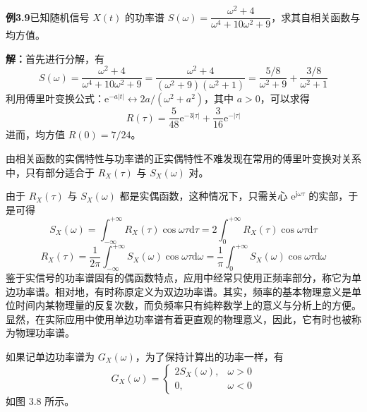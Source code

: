 \documentclass[11pt,openany,UTF8]{ctexbook}
\newcommand{\dif}{\mathrm{d}}                      %
\newcommand{\eu}{\mathrm{e}}                       %
\newcommand{\ju}{\mathrm{j}}                       %
\begin{document}
\begin{examplebox}
\textbf{例3.9}\quad 已知随机信号 $X(t)$ 的功率谱 $S(\omega)=\dfrac{\omega^2+4}{\omega^4+10\omega^2+9}$\nobreak，求其自相关函数与均方值\nobreak。

\textbf{解\nobreak：}\quad 首先进行分解\nobreak，有
\[
S(\omega)=\frac{\omega^2+4}{\omega^4+10\omega^2+9}=\frac{\omega^2+4}{(\omega^2+9)(\omega^2+1)}=\frac{5/8}{\omega^2+9}+\frac{3/8}{\omega^2+1}
\]
利用傅里叶变换公式\nobreak：$\eu^{-a\lvert t\rvert}\longleftrightarrow 2a/(\omega^2+a^2)$\nobreak，其中 $a>0$\nobreak，可以求得
\[
R(\tau)=\frac{5}{48}\eu^{-3\lvert\tau\rvert}+\frac{3}{16}\eu^{-\lvert\tau\rvert}
\]
进而\nobreak，均方值 $R(0)=7/24$\nobreak。
\end{examplebox}

由相关函数的实偶特性与功率谱的正实偶特性不难发现在常用的傅里叶变换对关系中\nobreak，只有部分适合于 $R_X(\tau)$ 与 $S_X(\omega)$ 对\nobreak。

由于 $R_X(\tau)$ 与 $S_X(\omega)$ 都是实偶函数\nobreak，这种情况下\nobreak，只需关心 $\eu^{\ju\omega\tau}$ 的实部\nobreak，于是可得
\begin{equation}
S_X(\omega)=\int_{-\infty}^{+\infty}R_X(\tau)\cos\omega\tau\dif\tau=2\int_{0}^{+\infty}R_X(\tau)\cos\omega\tau\dif\tau
\label{eq:3.20}
\end{equation}
\begin{equation}
R_X(\tau)=\frac{1}{2\pi}\int_{-\infty}^{+\infty}S_X(\omega)\cos\omega\tau\dif\omega=\frac{1}{\pi}\int_{0}^{+\infty}S_X(\omega)\cos\omega\tau\dif\omega
\label{eq:3.21}
\end{equation}
鉴于实信号的功率谱固有的偶函数特点\nobreak，应用中经常只使用正频率部分\nobreak，称它为单边功率谱\nobreak。相对地\nobreak，有时称原定义为双边功率谱\nobreak。其实\nobreak，频率的基本物理意义是单位时间内某物理量的反复次数\nobreak，而负频率只有纯粹数学上的意义与分析上的方便\nobreak。显然\nobreak，在实际应用中使用单边功率谱有着更直观的物理意义\nobreak，因此\nobreak，它有时也被称为物理功率谱\nobreak。

如果记单边功率谱为 $G_X(\omega)$\nobreak，为了保持计算出的功率一样\nobreak，有
\begin{equation}
G_X(\omega)=\begin{cases}2S_X(\omega), & \omega>0\\ 0, & \omega<0\end{cases}
\label{eq:3.22}
\end{equation}
如图 3.8 所示\nobreak。
\end{document}
